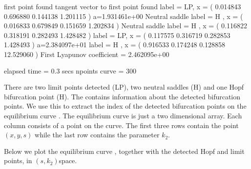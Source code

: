 \documentclass[letterpaper,10pt,english]{jupyterBook}
\begin{document}
\begin{sphinxVerbatim}[commandchars=\\\{\}]
first point found
tangent vector to first point found
label = LP, x = ( 0.014843 0.696880 0.144138 1.201115 )
a=1.931461e+00
Neutral saddle
label = H , x = ( 0.016833 0.679849 0.151659 1.202834 )
Neutral saddle
label = H , x = ( 0.116822 0.318191 0.282493 1.428482 )
label = LP, x = ( 0.117575 0.316719 0.282853 1.428493 )
a=\PYGZhy{}2.384097e+01
label = H , x = ( 0.916533 \PYGZhy{}0.174248 0.128858 \PYGZhy{}12.529060 )
First Lyapunov coefficient = \PYGZhy{}2.462095e+00

elapsed time  = 0.3 secs
npoints curve = 300
\end{sphinxVerbatim}

\sphinxAtStartPar
There are two limit points detected (LP), two neutral saddles (H) and one Hopf
bifurcation point (H). The   contains
information about the detected bifurcation points. We use this to extract the
index of the detected bifurcation points on the equilibrium curve . The
equilibrium curve  is just a two dimensional array. Each column
consists of a point on the curve. The first three rows contain the point
\((x,y,s)\) while the last row contains the parameter \(k_2\).

\sphinxAtStartPar
Below we plot the equilibrium curve , together with the detected Hopf and
limit points, in \((s,k_2)\)\sphinxhyphen{}space.
\end{document}
